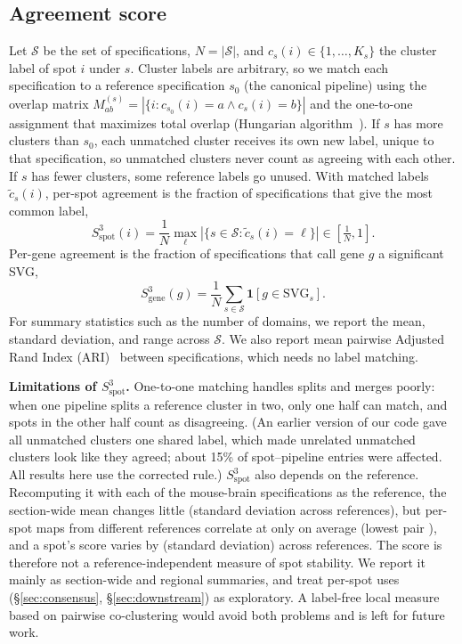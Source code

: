 \subsection{Agreement score}
\label{sec:s3}
Let $\mathcal{S}$ be the set of specifications, $N=|\mathcal{S}|$, and
$c_s(i)\in\{1,\dots,K_s\}$ the cluster label of spot $i$ under $s$. Cluster
labels are arbitrary, so we match each specification to a reference
specification $s_0$ (the canonical pipeline) using the overlap matrix
$M^{(s)}_{ab}=|\{i: c_{s_0}(i)=a \wedge c_s(i)=b\}|$ and the one-to-one
assignment that maximizes total overlap (Hungarian
algorithm~\cite{kuhn1955hungarian}). If $s$ has more clusters than $s_0$,
each unmatched cluster receives its own new label, unique to that
specification, so unmatched clusters never count as agreeing with each
other. If $s$ has fewer clusters, some reference
labels go unused. With matched labels $\tilde c_s(i)$, per-spot agreement
is the fraction of specifications that give the most common label,
\begin{equation}
  S^3_{\text{spot}}(i) = \frac{1}{N}\max_{\ell}\left|\{s\in\mathcal{S}:\tilde
  c_s(i)=\ell\}\right| \in \left[\tfrac1N,1\right].
\end{equation}
Per-gene agreement is the fraction of specifications that call gene $g$ a
significant SVG,
\begin{equation}
  S^3_{\text{gene}}(g) = \frac1N\sum_{s\in\mathcal{S}} \mathbf{1}[g\in\text{SVG}_s].
  \label{eq:s3gene}
\end{equation}
For summary statistics such as the number of domains, we report the mean,
standard deviation, and range across $\mathcal{S}$. We also report mean
pairwise Adjusted Rand Index (ARI)~\cite{hubert1985comparing} between
specifications, which needs no label matching.

\textbf{Limitations of $S^3_{\text{spot}}$.} One-to-one matching handles
splits and merges poorly: when one pipeline splits a reference cluster in
two, only one half can match, and spots in the other half count as
disagreeing. (An earlier version of our code gave all unmatched clusters
one shared label, which made unrelated unmatched clusters look like they
agreed; about 15\% of spot--pipeline entries were affected. All results
here use the corrected rule.) $S^3_{\text{spot}}$
also depends on the reference. Recomputing it with each of the
\RefRobustN{} mouse-brain specifications as the reference, the
section-wide mean changes little (standard deviation
\RefRobustAggMeanStd{} across references), but per-spot maps from different
references correlate at only \RefRobustMeanPearson{} on average (lowest
pair \RefRobustMinPearson{}), and a spot's score varies by
\RefRobustMeanPerSpotStd{} (standard deviation) across references. The
score is therefore not a reference-independent measure of spot stability.
We report it mainly as section-wide and regional summaries, and treat
per-spot uses (\S\ref{sec:consensus}, \S\ref{sec:downstream}) as
exploratory. A label-free local measure based on pairwise co-clustering
would avoid both problems and is left for future work.

